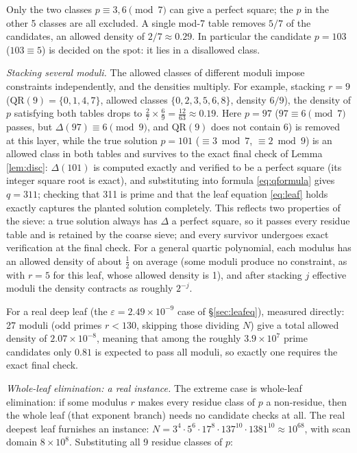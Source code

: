 \documentclass[11pt]{article}
\theoremstyle{remark}
\newcommand{\QR}{\mathrm{QR}}
\begin{document}
Only the two classes $p \equiv 3, 6 \pmod 7$ can give a perfect square; the $p$ in the other 5 classes are all excluded. A single mod-7 table removes $5/7$ of the candidates, an allowed density of $2/7 \approx 0.29$. In particular the candidate $p = 103$ ($103 \equiv 5$) is decided on the spot: it lies in a disallowed class.

\emph{Stacking several moduli.} The allowed classes of different moduli impose constraints independently, and the densities multiply. For example, stacking $r = 9$ ($\QR(9) = \{0,1,4,7\}$, allowed classes $\{0,2,3,5,6,8\}$, density $6/9$), the density of $p$ satisfying both tables drops to $\tfrac{2}{7} \times \tfrac{6}{9} = \tfrac{12}{63} \approx 0.19$. Here $p = 97$ ($97 \equiv 6 \pmod 7$ passes, but $\Delta(97) \equiv 6 \pmod 9$, and $\QR(9)$ does not contain 6) is removed at this layer, while the true solution $p = 101$ ($\equiv 3 \bmod 7$, $\equiv 2 \bmod 9$) is an allowed class in both tables and survives to the exact final check of Lemma \ref{lem:disc}: $\Delta(101)$ is computed exactly and verified to be a perfect square (its integer square root is exact), and substituting into formula \eqref{eq:qformula} gives $q = 311$; checking that 311 is prime and that the leaf equation \eqref{eq:leaf} holds exactly captures the planted solution completely. This reflects two properties of the sieve: a true solution always has $\Delta$ a perfect square, so it passes every residue table and is retained by the coarse sieve; and every survivor undergoes exact verification at the final check. For a general quartic polynomial, each modulus has an allowed density of about $\tfrac{1}{2}$ on average (some moduli produce no constraint, as with $r = 5$ for this leaf, whose allowed density is 1), and after stacking $j$ effective moduli the density contracts as roughly $2^{-j}$.

For a real deep leaf (the $\varepsilon = 2.49 \times 10^{-9}$ case of \S\ref{sec:leafeq}), measured directly: 27 moduli (odd primes $r < 130$, skipping those dividing $N$) give a total allowed density of $2.07 \times 10^{-8}$, meaning that among the roughly $3.9 \times 10^7$ prime candidates only $0.81$ is expected to pass all moduli, so exactly one requires the exact final check.

\emph{Whole-leaf elimination: a real instance.} The extreme case is whole-leaf elimination: if some modulus $r$ makes every residue class of $p$ a non-residue, then the whole leaf (that exponent branch) needs no candidate checks at all. The real deepest leaf furnishes an instance: $N = 3^4 \cdot 5^6 \cdot 17^8 \cdot 137^{10} \cdot 1381^{10} \approx 10^{68}$, with scan domain $8 \times 10^8$. Substituting all 9 residue classes of $p$:
\end{document}
